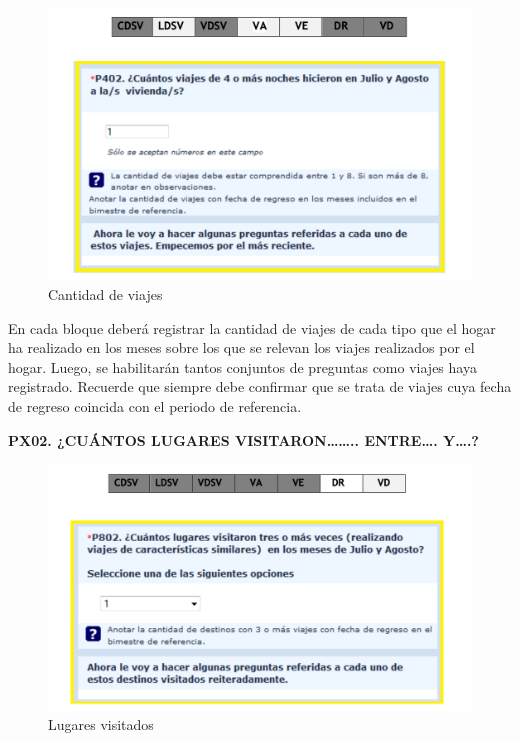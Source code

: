 \documentclass[
  openany]{book}
\begin{document}
\begin{figure}

{\centering \includegraphics[width=1\linewidth]{imagenes/figura6-74} 

}

\caption{Cantidad de viajes}\label{fig:cantidad9}
\end{figure}

En cada bloque deberá registrar la cantidad de viajes de cada tipo que el hogar ha realizado en los meses sobre los que se relevan los viajes realizados por el hogar. Luego, se habilitarán tantos conjuntos de preguntas como viajes haya registrado. Recuerde que siempre debe confirmar que se trata de viajes cuya fecha de regreso coincida con el periodo de referencia.

\textbf{PX02. ¿CUÁNTOS LUGARES VISITARON\ldots\ldots.. ENTRE\ldots. Y\ldots.?}

\begin{figure}

{\centering \includegraphics[width=1\linewidth]{imagenes/figura6-75} 

}

\caption{Lugares visitados}\label{fig:lugaresvisit}
\end{figure}
\end{document}
